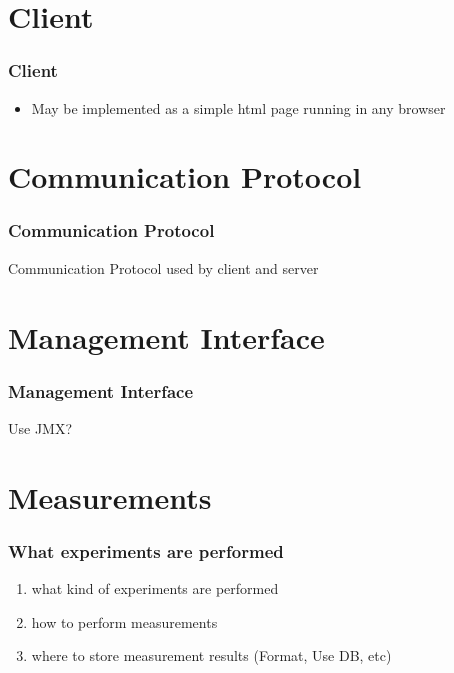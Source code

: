 \documentclass{beamer}
\begin{document}
\section{Client}
\begin{frame}
\frametitle{Client}
\begin{itemize}
\item May be implemented as a simple html page running in any browser
\end{itemize}
\end{frame}


\section{Communication Protocol}
\begin{frame}
\frametitle{Communication Protocol}
Communication Protocol used by client and server
\end{frame}



\section{Management Interface}
\begin{frame}
\frametitle{Management Interface}
Use JMX?
\end{frame}


\section{Measurements}
\begin{frame}
\frametitle{What experiments are performed}


\begin{enumerate}
\item what kind of experiments are performed
\item how to perform measurements
\item where to store measurement results (Format, Use DB, etc)
\end{enumerate}

\end{frame}
\end{document}
